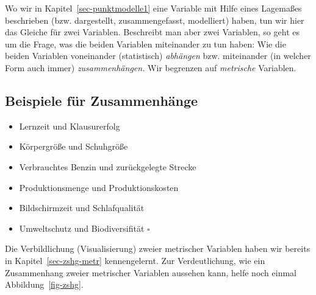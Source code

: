 \documentclass[
  letterpaper,
]{scrbook}
\providecommand{\tightlist}{%
  \setlength{\itemsep}{0pt}\setlength{\parskip}{0pt}}\usepackage{longtable,booktabs,array}
\theoremstyle{definition}
\theoremstyle{definition}
\theoremstyle{definition}
\theoremstyle{remark}
\begin{document}
Wo wir in Kapitel~\ref{sec-punktmodelle1} eine Variable mit Hilfe eines
Lagemaßes beschrieben (bzw. dargestellt, zusammengefasst, modelliert)
haben, tun wir hier das Gleiche für zwei Variablen. Beschreibt man aber
zwei Variablen, so geht es um die Frage, was die beiden Variablen
miteinander zu tun haben: Wie die beiden Variablen voneinander
(statistisch) \emph{abhängen} bzw. miteinander (in welcher Form auch
immer) \emph{zusammenhängen.} Wir begrenzen auf \emph{metrische}
Variablen.

\subsection{Beispiele für
Zusammenhänge}\label{beispiele-fuxfcr-zusammenhuxe4nge}

\begin{itemize}
\tightlist
\item
  Lernzeit und Klausurerfolg
\item
  Körpergröße und Schuhgröße
\item
  Verbrauchtes Benzin und zurückgelegte Strecke
\item
  Produktionsmenge und Produktionskosten
\item
  Bildschirmzeit und Schlafqualität
\item
  Umweltschutz und Biodiversifität \(\square\)
\end{itemize}

Die Verbildlichung (Visualisierung) zweier metrischer Variablen haben
wir bereits in Kapitel~\ref{sec-zshg-metr} kennengelernt. Zur
Verdeutlichung, wie ein Zusammenhang zweier metrischer Variablen
aussehen kann, helfe noch einmal Abbildung~\ref{fig-zshg}.
\end{document}
